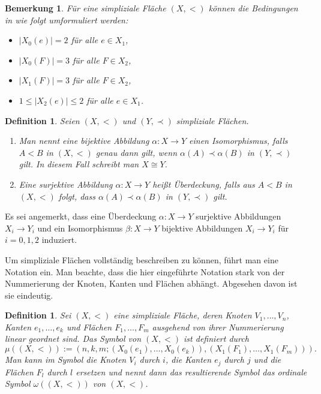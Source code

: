 \documentclass[12pt,titlepage,twoside,cleardoublepage]{article}
\theoremstyle{nummermitklammern}
\newtheorem{definition}[temp]{Definition}
\newtheorem{bemerkung}[temp]{Bemerkung}
\newtheorem{definition}[zahl]{Definition}
\newtheorem{bemerkung}[zahl]{Bemerkung}
\numberwithin{equation}{section}
\begin{document}
\begin{bemerkung}
Für eine simpliziale Fläche $(X,<)$ können die Bedingungen in  wie folgt umformuliert werden:
\begin{itemize}
\item $\vert X_{0}(e)\vert=2$ für alle $e \in X_{1}$,
\item $\vert X_{0}(F)\vert=3$ für alle $F \in X_{2}$,
\item $\vert X_{1}(F)\vert=3$ für alle $F \in X_{2}$,
\item $1\leq  \vert X_{2}(e)\vert \leq 2$ für alle $e \in X_{1}$.

\end{itemize}
\end{bemerkung}

\begin{definition} Seien $(X,<)$ und $(Y,\prec)$ simpliziale Flächen.
\begin{enumerate}
 \item Man nennt eine bijektive Abbildung $\alpha: X \to Y$ einen Isomorphismus, falls $A<B$ in $(X,<)$ genau dann gilt, wenn $\alpha(A) \prec \alpha(B)$ in $(Y,\prec)$ gilt. In diesem Fall schreibt man $X \cong Y$.
\item Eine surjektive Abbildung $\alpha: X \to Y$ heißt Überdeckung, falls aus $A<B$ in $(X,<)$ folgt, dass $\alpha(A) \prec \alpha(B)$ in $(Y,\prec)$ gilt. 
\end{enumerate}
\end{definition}
Es sei angemerkt, dass eine Überdeckung $\alpha:X\to Y$ surjektive Abbildungen $X_{i} \to Y_{i}$ und ein Isomorphismus $\beta:X \to Y$ bijektive Abbildungen $X_{i} \to Y_{i}$ für $i=0,1,2$ induziert.

Um simpliziale Flächen vollständig beschreiben zu können, führt man eine Notation ein. Man beachte, dass die hier eingeführte Notation stark von der Nummerierung der Knoten, Kanten und Flächen abhängt. Abgesehen davon ist sie eindeutig.
\begin{definition}
 Sei $(X,<)$ eine simpliziale Fläche, deren Knoten $V_{1},\ldots,V_{n}$, Kanten $e_{1},\ldots,e_{k}$ und Flächen $F_{1},\ldots,F_{m}$ ausgehend von ihrer Nummerierung linear geordnet sind. Das \emph{Symbol} von $(X,<)$ ist definiert durch 
\[
\mu((X,<)):=(n,k,m;(X_{0}(e_{1}),\ldots,X_{0}(e_{k})),(X_{1}(F_{1}),\ldots,X_{1}(F_{m}))).
\]
Man kann im Symbol die Knoten $V_{i}$ durch $i$, die Kanten $e_{j}$ durch $j$ und die Flächen $F_{l}$ durch $l$ ersetzen und nennt dann das resultierende Symbol das \emph{ordinale Symbol} $\omega((X,<))$ von $(X,<)$.
\end{definition}
\end{document}
